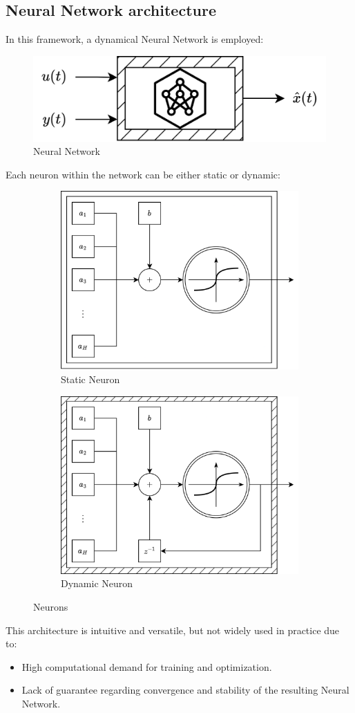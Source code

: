 \subsection{Neural Network architecture}
In this framework, a dynamical Neural Network is employed:
\begin{figure}[H]
    \centering
    \includegraphics[width=0.4\linewidth]{images/nn.png}
    \caption{Neural Network}
\end{figure}
Each neuron within the network can be either static or dynamic:
\begin{figure}[H]
    \centering
    \begin{subfigure}{0.49\textwidth}
        \centering
        \includegraphics[width=0.75\linewidth]{images/snn.png} 
        \caption{Static Neuron}
    \end{subfigure}
    \begin{subfigure}{0.49\textwidth}
        \centering
        \includegraphics[width=0.75\linewidth]{images/dnn.png}
        \caption{Dynamic Neuron}
    \end{subfigure}
    \caption{Neurons}
\end{figure}
This architecture is intuitive and versatile, but not widely used in practice due to:
\begin{itemize}
    \item High computational demand for training and optimization.
    \item Lack of guarantee regarding convergence and stability of the resulting Neural Network.
\end{itemize}


